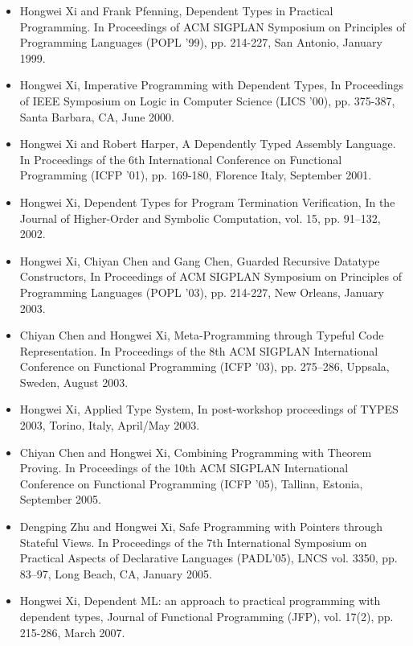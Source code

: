 \documentclass{article}
\begin{document}
\vspace{18pt}
\begin{itemize}
\item
Hongwei Xi and Frank Pfenning, Dependent Types in Practical
Programming. In Proceedings of ACM SIGPLAN Symposium on Principles of
Programming Languages (POPL '99), pp. 214-227, San Antonio, January 1999.
\item Hongwei Xi, Imperative Programming with Dependent Types,
In Proceedings of IEEE Symposium on Logic in Computer Science
(LICS '00), pp. 375-387, Santa Barbara, CA, June 2000.
\item Hongwei Xi and Robert Harper, A Dependently Typed Assembly Language.
In Proceedings of the 6th International Conference on Functional
Programming (ICFP '01), pp. 169-180, Florence Italy, September 2001.
\item Hongwei Xi,
Dependent Types for Program Termination Verification,
In the Journal of Higher-Order and Symbolic Computation, vol. 15,
pp. 91--132, 2002.
\item Hongwei Xi, Chiyan Chen and Gang Chen,
Guarded Recursive Datatype Constructors, In Proceedings of ACM SIGPLAN
Symposium on Principles of Programming Languages (POPL '03), pp. 214-227,
New Orleans, January 2003.
\item Chiyan Chen and Hongwei Xi,
Meta-Programming through Typeful Code Representation. In Proceedings of the
8th ACM SIGPLAN International Conference on Functional Programming
(ICFP '03), pp. 275--286, Uppsala, Sweden, August 2003.
\item
Hongwei Xi,
Applied Type System, In post-workshop proceedings of TYPES 2003, 
Torino, Italy, April/May 2003.
\item
Chiyan Chen and Hongwei Xi,
Combining Programming with Theorem Proving. In Proceedings of the 10th ACM
SIGPLAN International Conference on Functional Programming (ICFP '05),
Tallinn, Estonia, September 2005.
\item
Dengping Zhu and Hongwei Xi,
Safe Programming with Pointers through Stateful Views. In Proceedings of
the 7th International Symposium on Practical Aspects of Declarative
Languages (PADL'05), LNCS vol. 3350, pp. 83--97, Long Beach, CA, January
2005.
\item
Hongwei Xi,
Dependent ML: an approach to practical programming
with dependent types, Journal of Functional Programming (JFP), vol. 17(2),
pp. 215-286, March 2007.
\end{itemize}
\end{document}
